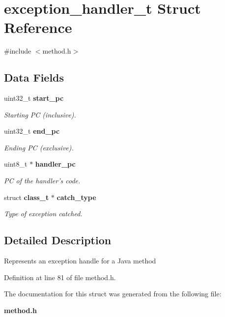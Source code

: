 \section{exception\_\-handler\_\-t Struct Reference}
\label{structexception__handler__t}


{\ttfamily \#include $<$method.h$>$}

\subsection*{Data Fields}
\begin{DoxyCompactItemize}
\item 
uint32\_\-t {\bf start\_\-pc}\label{structexception__handler__t_aa8b03ddf04878db7113ac87bb4ced58b}

\begin{DoxyCompactList}\small\item\em Starting PC (inclusive). \item\end{DoxyCompactList}\item 
uint32\_\-t {\bf end\_\-pc}\label{structexception__handler__t_a8dfb60d3569cf69c09e72821e475b241}

\begin{DoxyCompactList}\small\item\em Ending PC (exclusive). \item\end{DoxyCompactList}\item 
uint8\_\-t $\ast$ {\bf handler\_\-pc}\label{structexception__handler__t_a145ac74b98ea231df4ddf20fd57087aa}

\begin{DoxyCompactList}\small\item\em PC of the handler's code. \item\end{DoxyCompactList}\item 
struct {\bf class\_\-t} $\ast$ {\bf catch\_\-type}\label{structexception__handler__t_a18fc7076489195e4530e64625242e010}

\begin{DoxyCompactList}\small\item\em Type of exception catched. \item\end{DoxyCompactList}\end{DoxyCompactItemize}


\subsection{Detailed Description}
Represents an exception handle for a Java method 

Definition at line 81 of file method.h.



The documentation for this struct was generated from the following file:\begin{DoxyCompactItemize}
\item 
{\bf method.h}\end{DoxyCompactItemize}
